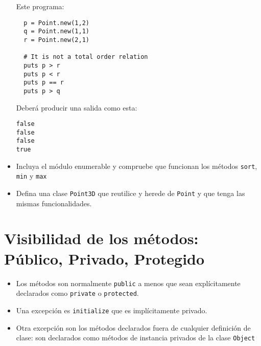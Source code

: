 \begin{itemize}
Este programa:
\begin{verbatim}
  p = Point.new(1,2)
  q = Point.new(1,1)
  r = Point.new(2,1)

  # It is not a total order relation
  puts p > r 
  puts p < r 
  puts p == r
  puts p > q 
\end{verbatim}
Deberá producir una salida como esta:
\begin{verbatim}
false
false
false
true
\end{verbatim}
\item Incluya el módulo enumerable y compruebe que funcionan los métodos 
\verb|sort|, \verb|min| y \verb|max|
\item
Defina una clase \verb|Point3D| que reutilice y herede de \verb|Point| y que tenga las mismas funcionalidades.
\end{itemize}


\section{Visibilidad de los métodos: Público, Privado, Protegido}


\begin{itemize}
\item
Los métodos son normalmente \verb|public| a menos que sean explícitamente declarados como \verb|private| o \verb|protected|. 
\item
Una excepción es \verb|initialize| que es implícitamente privado.
\item
Otra excepción son los métodos declarados fuera de cualquier definición de clase: son declarados como métodos de instancia privados de la clase \verb|Object|
\end{itemize}

